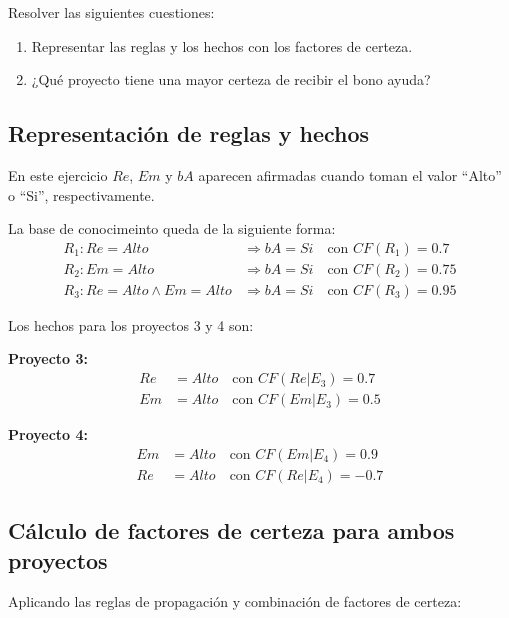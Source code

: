\documentclass[11pt,a4paper]{article}
\begin{document}
Resolver las siguientes cuestiones:

\begin{enumerate}[leftmargin=2em, topsep=1ex, label=\alph*)]
    \item Representar las reglas y los hechos con los factores de certeza. 
    \item ¿Qué proyecto tiene una mayor certeza de recibir el bono ayuda?
\end{enumerate}

\subsection*{Representación de reglas y hechos}

En este ejercicio $Re$, $Em$ y $bA$ aparecen afirmadas cuando toman el valor ``Alto'' o ``Si'', respectivamente.

La base de conocimeinto queda de la siguiente forma:
\begin{align*}
    R_1: Re=Alto &\Rightarrow bA=Si \quad \text{con } CF(R_1)=0.7 \\
    R_2: Em=Alto &\Rightarrow bA=Si \quad \text{con } CF(R_2)=0.75 \\
    R_3: Re=Alto \wedge Em=Alto &\Rightarrow bA=Si \quad \text{con } CF(R_3)=0.95
\end{align*}

Los hechos para los proyectos 3 y 4 son:

\textbf{Proyecto 3:}
\begin{align*}
    Re&=Alto \quad \text{con } CF(Re|E_3)=0.7 \\
    Em&=Alto \quad \text{con } CF(Em|E_3)=0.5
\end{align*}

\textbf{Proyecto 4:}
\begin{align*}
    Em&=Alto \quad \text{con } CF(Em|E_4)=0.9 \\
    Re&=Alto \quad \text{con } CF(Re|E_4)=-0.7
\end{align*}

\subsection*{Cálculo de factores de certeza para ambos proyectos}

Aplicando las reglas de propagación y combinación de factores de certeza:
\end{document}

